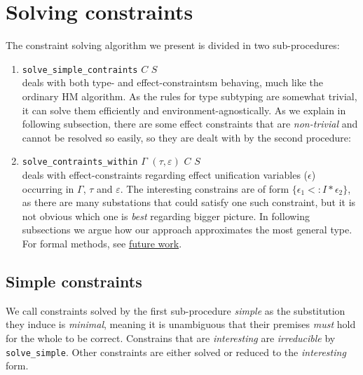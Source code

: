 \documentclass[declaration,shortabstract]{iithesis}
\theoremstyle{definition} \newtheorem{definition}{Definition}[section]
\begin{document}
\section{Solving constraints}
The constraint solving algorithm we present is divided in two sub-procedures:
\begin{enumerate}
    \item \texttt{solve\_simple\_contraints} $C$ $S$\\
    deals with both type- and effect-constraintsm behaving, much like the ordinary HM algorithm.
    As the rules for type subtyping are somewhat trivial, it can solve them efficiently and environment-agnostically. As we explain in following subsection, there are some effect constraints that are \textit{non-trivial} and cannot be resolved so easily, so they are dealt with by the second procedure:
    
    \item \texttt{solve\_contraints\_within} $\Gamma$ $(\tau, \varepsilon)$ $C$ $S$ \\
    deals with effect-constraints regarding effect unification variables ($\epsilon$) occurring in $\Gamma$, $\tau$ and $\varepsilon$.
    The interesting constrains are of form $\{\epsilon_1 <: I * \epsilon_2\}$,
    as there are many substations that could satisfy one such constraint, but it is not obvious which one is \textit{best} regarding bigger picture.
    In following subsections we argue how our approach approximates the most general type.
    For formal methods, see \hyperlink{chapter.6}{future work}.
\end{enumerate}

\subsection{Simple constraints}
We call constraints solved by the first sub-procedure \textit{simple} as the substitution they induce is \textit{minimal},
meaning it is unambiguous that their premises \textit{must} hold for the whole to be correct. Constrains that are \textit{interesting} are \textit{irreducible} by \texttt{solve\_simple}.
Other constraints are either solved or reduced to the \textit{interesting} form.
\end{document}
